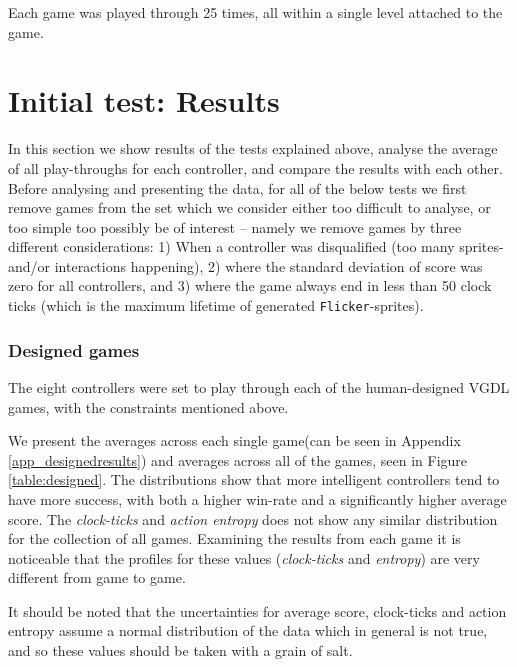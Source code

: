 \documentclass[a4paper,titlepage,final]{report}
\begin{document}
Each game was played through 25 times, all within a single level attached to the game.


\section{Initial test: Results}
\label{sec_task1inittestresults}
 
In this section we show results of the tests explained above, analyse the average of all play-throughs for each controller, and compare the results with each other.
Before analysing and presenting the data, for all of the below tests we first remove games from the set which we consider either too difficult to analyse, or too simple too possibly be of interest -- namely we remove games by three different considerations: 
1) When a controller was disqualified (too many sprites- and/or interactions happening), 2) where the standard deviation of score was zero for all controllers, and 3) where the game always end in less than 50 clock ticks (which is the maximum lifetime of generated \texttt{Flicker}-sprites).

\subsubsection*{Designed games}
The eight controllers were set to play through each of the human-designed VGDL games, with the constraints mentioned above.

We present the averages across each single game(can be seen in Appendix \ref{app_designedresults}) and averages across all of the games, seen in Figure \ref{table:designed}.
The distributions show that more intelligent controllers tend to have more success, with both a higher win-rate and a significantly higher average score. 
The \textit{clock-ticks} and \textit{action entropy} does not show any similar distribution for the collection of all games. 
Examining the results from each game it is noticeable that the profiles for these values (\textit{clock-ticks} and \textit{entropy}) are very different from game to game.

It should be noted that the uncertainties for average score, clock-ticks and action entropy assume a normal distribution of the data which in general is not true, and so these values should be taken with a grain of salt.
\end{document}
